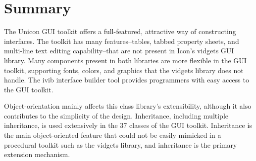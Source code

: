 \section{Summary}

The Unicon GUI toolkit offers a full-featured, attractive way of
constructing interfaces. The toolkit has many features--tables,
tabbed property sheets, and multi-line text editing capability--that
are not present in Icon's vidgets GUI
library. Many components present in both libraries are more
flexible in the GUI toolkit, supporting fonts, colors, and graphics
that the vidgets library does not handle. The ivib interface
builder tool provides programmers with easy access to the GUI toolkit.

Object-orientation mainly affects this class library's
extensibility, although it also contributes to the
simplicity of the design. Inheritance, including multiple inheritance,
is used extensively in the 37 classes of the GUI toolkit. Inheritance
is the main object-oriented feature that could not be easily mimicked
in a procedural toolkit such as the vidgets library, and inheritance is
the primary extension mechanism.
